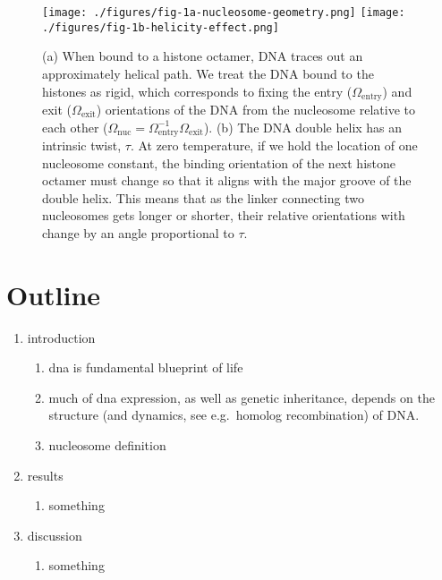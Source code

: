 \documentclass[%
 reprint,
superscriptaddress,
showpacs,preprintnumbers,
 amsmath,amssymb,
 aps,
 prl,
]{revtex4-1}
\begin{document}
\begin{figure}[t]
    \centering
    \texttt{[image: ./figures/fig-1a-nucleosome-geometry.png]}
    \texttt{[image: ./figures/fig-1b-helicity-effect.png]}
    \caption{(a) When bound to a histone octamer, DNA traces out an
    approximately helical path. We treat the DNA bound to the histones as rigid,
    which corresponds to fixing the entry ($\Omega_\text{entry}$) and exit
    ($\Omega_\text{exit}$) orientations of the DNA from the nucleosome relative
    to each other ($\Omega_\text{nuc} =
    \Omega_\text{entry}^{-1}\Omega_\text{exit}$).
    (b) The DNA double helix has an intrinsic twist, $\tau$. At zero
    temperature, if we hold the location of one nucleosome constant, the binding
    orientation of the next histone octamer must change so that it aligns with
    the major groove of the double helix. This means that as the linker
    connecting two nucleosomes gets longer or shorter, their relative
    orientations with change by an angle proportional to $\tau$.}
\end{figure}

\section{Outline}
\begin{enumerate}
    \item introduction
    \begin{enumerate}
        \item dna is fundamental blueprint of life
        \item much of dna expression, as well as genetic inheritance, depends on the
            structure (and dynamics, see e.g.\ homolog recombination) of DNA.\
        \item nucleosome definition
    \end{enumerate}

    \item results
    \begin{enumerate}
        \item something
    \end{enumerate}

    \item discussion
    \begin{enumerate}
        \item something
    \end{enumerate}
\end{enumerate}
\end{document}
